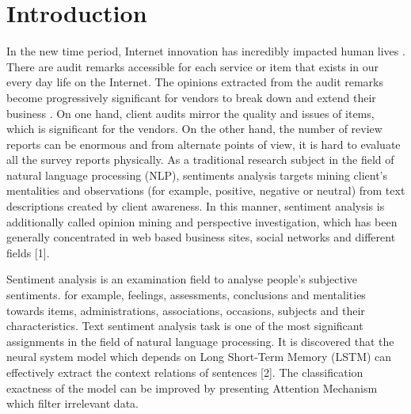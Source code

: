 \documentclass[sigplan,screen]{acmart}
\begin{document}


 
\maketitle

\section{Introduction}
                       In the new time period, Internet innovation has incredibly impacted human lives . There are audit remarks accessible for each service or item that exists in our every day life on the Internet. The opinions extracted from the audit remarks become progressively significant for vendors to break down and extend their business . On one hand, client audits mirror the quality and issues of items, which is significant for the vendors. On the other hand, the number of review reports can be enormous and from alternate points of view, it is hard to evaluate all the survey reports physically. As a traditional research subject in the field of natural language processing (NLP), sentiments analysis targets mining client's mentalities and observations (for example, positive, negative or neutral) from text descriptions created by client awareness. In this manner, sentiment analysis is additionally called opinion mining and perspective investigation, which has been generally concentrated in web based business sites, social networks and different fields [1].
                       
                       Sentiment analysis is an examination field to analyse people’s subjective sentiments. for example, feelings, assessments, conclusions and mentalities towards items, administrations, associations, occasions, subjects and their characteristics. Text sentiment analysis task is one of the most significant assignments in the field of natural language processing. It is discovered that the neural system model which depends on Long Short-Term Memory (LSTM) can effectively extract the context relations of sentences [2]. The classification exactness of the model can be improved by presenting Attention Mechanism which filter irrelevant data. 
                       
\end{document}
